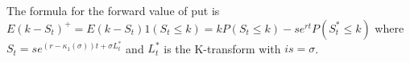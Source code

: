 \documentclass[fleqn]{amsart}
\newcommand{\R}{\mathbf{R}}
\renewcommand{\AA}{\mathcal{A}}
\newcommand{\QQ}{\mathcal{Q}}
\begin{document}
The formula for the forward value of put is
\(E(k - S_t)^+ = E(k - S_t)1(S_t \le k)
= k P(S_t\le k) - se^{rt}P(S_t^* \le k)\) where
\(S_t = se^{(r - \kappa_1(\sigma))t + \sigma L_t^*}\) and
\(L_t^*\) is the K-transform with \(is = \sigma\).



%
%
%
%
%
\end{document}

